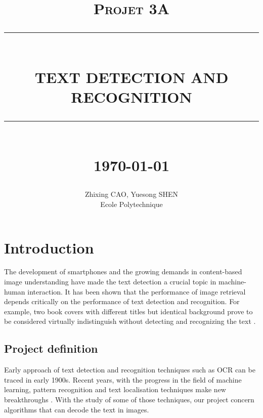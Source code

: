 \documentclass[paper=a4, french, 11pt]{scrartcl}
\newcommand{\HRule}[1]{\rule{\linewidth}{#1}}
\begin{document}
\title{ \normalsize \textsc{Projet 3A}
        \\ [2.0cm]
        \HRule{0.5pt} \\
        \LARGE \textbf{\uppercase{Text detection and recognition}}
        \HRule{2pt} \\ [0.5cm]
        \normalsize \today \vspace*{5\baselineskip}}

\date{}

\author{
        Zhixing CAO, Yuesong SHEN \\
        Ecole Polytechnique }

\maketitle
\newpage
\tableofcontents
\newpage

\sectionfont{\scshape}



\section{Introduction} \mbox{} \vspace{-0.5cm}

The development of smartphones and the growing demands in content-based image understanding have made the text detection a crucial topic in machine-human interaction. It has been shown that the performance of image retrieval depends critically on the performance of text detection and recognition. For example, two book covers with different titles but identical background prove to be considered virtually indistinguish without detecting and recognizing the text \cite{epshtein2010detecting}.

\subsection{Project definition} \mbox{} \vspace{-0.5cm}

Early approach of text detection and recognition techniques such as OCR can be traced in early 1900s. Recent years, with the progress in the field of machine learning, pattern recognition and text localisation techniques make new breakthroughs \cite{anzai2012pattern}. With the study of some of those techniques, our project concern algorithms that can decode the text in images.
\end{document}
